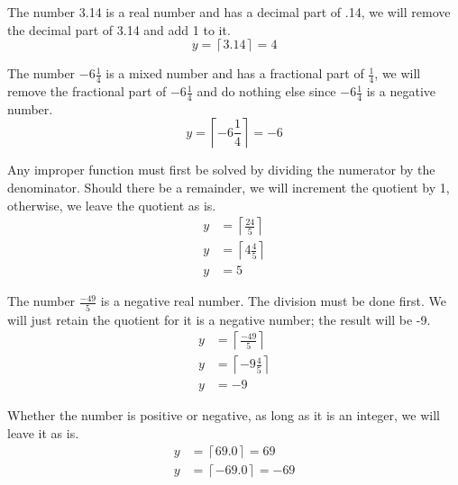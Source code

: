 \documentclass[letterpaper, twoside,12pt]{article}
\begin{document}
    The number 3.14 is a real number and has a decimal part of .14, we will remove the decimal part of 3.14 and add 1 to it.
    \begin{equation*}
        y = \left\lceil 3.14 \right\rceil = 4
    \end{equation*}

    The number $-6\frac{1}{4}$ is a mixed number and has a fractional part of $\frac{1}{4}$, we will remove the fractional part of $-6\frac{1}{4}$ and do nothing else since $-6\frac{1}{4}$ is a negative number.
    \begin{equation*}
        y = \left\lceil -6\frac{1}{4} \right\rceil = -6
    \end{equation*}

    Any improper function must first be solved by dividing the numerator by the denominator. Should there be a remainder, we will increment the quotient by 1, otherwise, we leave the quotient as is.
    \begin{equation*}
        \begin{split}
            y &= \left\lceil \frac{24}{5} \right\rceil \\
            y &= \left\lceil 4\frac{4}{5} \right\rceil \\
            y &= 5
        \end{split}
    \end{equation*}

    The number $\frac{-49}{5}$ is a negative real number. The division must be done first. We will just retain the quotient for it is a negative number; the result will be -9.
    \begin{equation*}
        \begin{split}
            y &= \left\lceil \frac{-49}{5} \right\rceil \\
            y &= \left\lceil -9\frac{4}{5} \right\rceil \\
            y &= -9
        \end{split}
    \end{equation*}

    Whether the number is positive or negative, as long as it is an integer, we will leave it as is.
    \begin{equation*}
        \begin{split}
            y &= \left\lceil 69.0 \right\rceil = 69\\
            y &= \left\lceil -69.0 \right\rceil = -69\\
        \end{split}
    \end{equation*}
\end{document}
